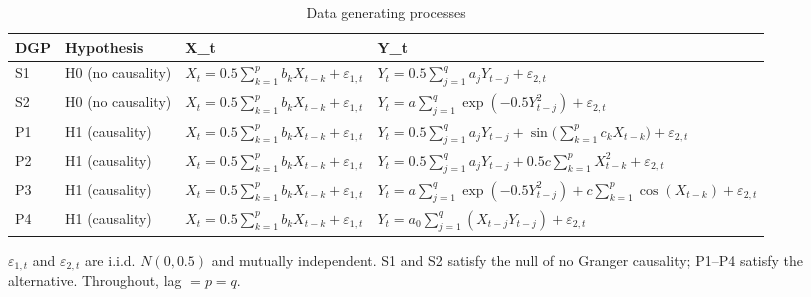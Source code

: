 \begin{table}[htbp]
\centering
\caption{Data generating processes}
\label{tab:dgps}
\small
\begin{tabular}{llll}
\toprule
DGP & Hypothesis & X\_t & Y\_t \\
\midrule
S1 & H0 (no causality) & $X_t = 0.5\sum_{k=1}^{p} b_k X_{t-k} + \varepsilon_{1,t}$ & $Y_t = 0.5\sum_{j=1}^{q} a_j Y_{t-j} + \varepsilon_{2,t}$ \\
S2 & H0 (no causality) & $X_t = 0.5\sum_{k=1}^{p} b_k X_{t-k} + \varepsilon_{1,t}$ & $Y_t = a\sum_{j=1}^{q} \exp(-0.5 Y_{t-j}^2) + \varepsilon_{2,t}$ \\
P1 & H1 (causality) & $X_t = 0.5\sum_{k=1}^{p} b_k X_{t-k} + \varepsilon_{1,t}$ & $Y_t = 0.5\sum_{j=1}^{q} a_j Y_{t-j} + \sin\!\big(\sum_{k=1}^{p} c_k X_{t-k}\big) + \varepsilon_{2,t}$ \\
P2 & H1 (causality) & $X_t = 0.5\sum_{k=1}^{p} b_k X_{t-k} + \varepsilon_{1,t}$ & $Y_t = 0.5\sum_{j=1}^{q} a_j Y_{t-j} + 0.5c\sum_{k=1}^{p} X_{t-k}^2 + \varepsilon_{2,t}$ \\
P3 & H1 (causality) & $X_t = 0.5\sum_{k=1}^{p} b_k X_{t-k} + \varepsilon_{1,t}$ & $Y_t = a\sum_{j=1}^{q} \exp(-0.5 Y_{t-j}^2) + c\sum_{k=1}^{p}\cos(X_{t-k}) + \varepsilon_{2,t}$ \\
P4 & H1 (causality) & $X_t = 0.5\sum_{k=1}^{p} b_k X_{t-k} + \varepsilon_{1,t}$ & $Y_t = a_0\sum_{j=1}^{q} (X_{t-j} Y_{t-j}) + \varepsilon_{2,t}$ \\
\bottomrule
\end{tabular}

\begin{minipage}{\linewidth}\footnotesize
$\varepsilon_{1,t}$ and $\varepsilon_{2,t}$ are i.i.d. $N(0,0.5)$ and mutually independent.  S1 and S2 satisfy the null of no Granger causality; P1--P4 satisfy the alternative.  Throughout, lag $=p=q$.
\end{minipage}
\end{table}
